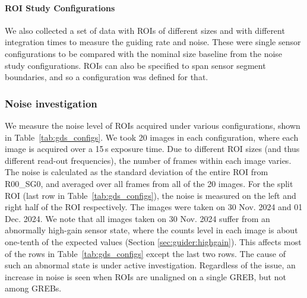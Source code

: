\paragraph*{ROI Study Configurations}
We also collected a set of data with ROIs of different sizes and with different integration times to measure the guiding rate and noise. These were single sensor configurations to be compared with the nominal size baseline from the noise study configurations. ROIs can also be specified to span sensor segment boundaries, and so a configuration was defined for that.

\subsubsection{Noise investigation}
We measure the noise level of ROIs acquired under various configurations, shown in Table~\ref{tab:gds_configs}. We took 20 images in each configuration, where each image is acquired over a 15\,s exposure time. Due to different ROI sizes (and thus different read-out frequencies), the number of frames within each image varies.  The noise is calculated as the standard deviation of the entire ROI from R00\_SG0, and averaged over all frames from all of the 20 images. For the split ROI (last row in Table~\ref{tab:gds_configs}), the noise is measured on the left and right half of the ROI respectively. The images were taken on 30 Nov. 2024 and 01 Dec. 2024. We note that all images taken on 30 Nov. 2024 suffer from an abnormally high-gain sensor state, where the counts level in each image is about one-tenth of the expected values (Section \ref{sec:guider:highgain}). This affects most of the rows in Table~\ref{tab:gds_configs} except the last two rows. The cause of such an abnormal state is under active investigation. Regardless of the issue, an increase in noise is seen when ROIs are unaligned on a single GREB, but not among GREBs.

